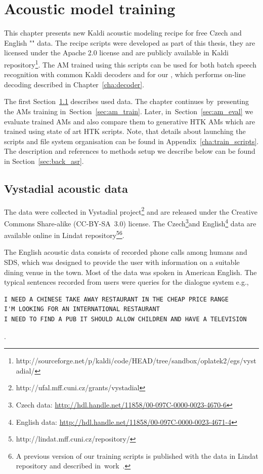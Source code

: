 \chapter{Acoustic model training}
\label{cha:train}

This chapter presents new Kaldi acoustic modeling recipe for free Czech and English "" data.
The recipe scripts were developed as part of this thesis, they are licensed under the Apache 2.0 license and are publicly available in Kaldi repository\footnote{http://sourceforge.net/p/kaldi/code/HEAD/tree/sandbox/oplatek2/egs/vystadial/}.
The \ac{AM} trained using this scripts can be used for both batch speech recognition with common Kaldi decoders and for our , which performs on-line decoding described in Chapter~\ref{cha:decoder}.

The first Section~\ref{sec:data} describes used data. 
The chapter continues by~presenting the \acp{AM} training in~Section~\ref{sec:am_train}. 
Later, in~Section~\ref{sec:am_eval} we evaluate trained \acp{AM} and also compare them to generative \ac{HTK} \acp{AM} which are trained using state of art \ac{HTK} scripts.
Note, that details about launching the scripts and file system organisation can be found in Appendix~\ref{cha:train_scripts}.  
The description and references to methods  setup we describe below can be found in Section~\ref{sec:back_asr}.

\section{Vystadial acoustic data}
\label{sec:data}

The data were collected in Vystadial project\footnote{http://ufal.mff.cuni.cz/grants/vystadial} and are released under the Creative Commons Share-alike (CC-BY-SA~3.0) license. 
The Czech\footnote{Czech data: \url{http://hdl.handle.net/11858/00-097C-0000-0023-4670-6}}and English\footnote{English data: \url{http://hdl.handle.net/11858/00-097C-0000-0023-4671-4}} data are available online in Lindat repository\footnote{{http://lindat.mff.cuni.cz/repository/}}\footnote{A previous version of our training scripts is published with the data in Lindat repository and described in~work~\cite{korvas_2014}.}.

The English acoustic data consists of recorded phone calls among humans and \acl{SDS}, which was designed to provide the user with information on a suitable dining venue in the town.
Most of the data was spoken in American English.
The typical sentences recorded from users were queries for the dialogue system e.g.,
\begin{verbatim}
I NEED A CHINESE TAKE AWAY RESTAURANT IN THE CHEAP PRICE RANGE
I'M LOOKING FOR AN INTERNATIONAL RESTAURANT
I NEED TO FIND A PUB IT SHOULD ALLOW CHILDREN AND HAVE A TELEVISION
\end{verbatim}.

